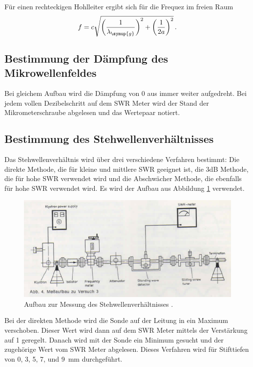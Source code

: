 Für einen rechteckigen Hohlleiter ergibt sich für die Frequez im freien Raum
\begin{equation}
  f=c \sqrt{\left(\frac{1}{\lambda_{\symup{g}}}\right)^2+\left(\frac{1}{2a}\right)^2} \,.
\end{equation}

\subsection{Bestimmung der Dämpfung des Mikrowellenfeldes}
\label{subsec:dämpfung}
Bei gleichem Aufbau wird die Dämpfung von 0 aus immer weiter aufgedreht. Bei jedem
vollen Dezibelschritt auf dem SWR Meter wird der Stand der Mikrometerschraube
abgelesen und das Wertepaar notiert.


\subsection{Bestimmung des Stehwellenverhältnisses}
\label{subsec:swr}

Das Stehwellenverhältnis wird über drei verschiedene Verfahren bestimmt: Die direkte
Methode, die für kleine und mittlere SWR geeignet ist, die 3dB Methode, die für hohe
SWR verwendet wird und die Abschwächer Methode, die ebenfalls für hohe SWR verwendet
wird. Es wird der Aufbau aus Abbildung \ref{fig:aufbau_swr} verwendet.

\begin{figure}
  \centering
  \includegraphics[width=\textwidth]{data/aufbau_swr.png}
  \caption{Aufbau zur Messung des Stehwellenverhältnisses \cite{Versuchsanleitung_alt}.}
  \label{fig:aufbau_swr}
\end{figure}

Bei der
direkten Methode wird die Sonde auf der Leitung in ein Maximum verschoben. Dieser
Wert wird dann auf dem SWR Meter mittels der Verstärkung auf 1 geregelt. Danach
wird mit der Sonde ein Minimum gesucht und der zugehörige Wert vom SWR Meter
abgelesen. Dieses Verfahren wird für Stifttiefen von 0, 3, 5, 7, und \SI{9}{\milli\meter}
durchgeführt.

